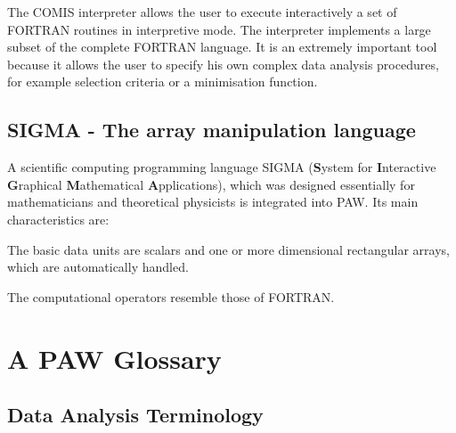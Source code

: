 The COMIS interpreter allows the user to execute interactively
a set of FORTRAN routines in interpretive mode.
The interpreter implements a large subset of the complete FORTRAN
language. It is an extremely important tool because
it allows the user
to specify his own complex data analysis procedures, for example
selection criteria or a minimisation function.

\subsection{SIGMA - The array manipulation language}

A scientific computing programming language SIGMA
({\bf S}ystem for {\bf I}nteractive
{\bf G}raphical {\bf M}athe\-ma\-tical
{\bf A}pplications),
which was designed essentially for mathematicians and
theoretical physicists is integrated into PAW.  Its main characteristics are:

\begin{UL}
\item The basic data units are scalars and one or more dimensional
      rectangular arrays, which are automatically handled.
\item The computational operators resemble those of FORTRAN.
\end{UL}

\section{A PAW Glossary}

\subsection*{Data Analysis Terminology}


